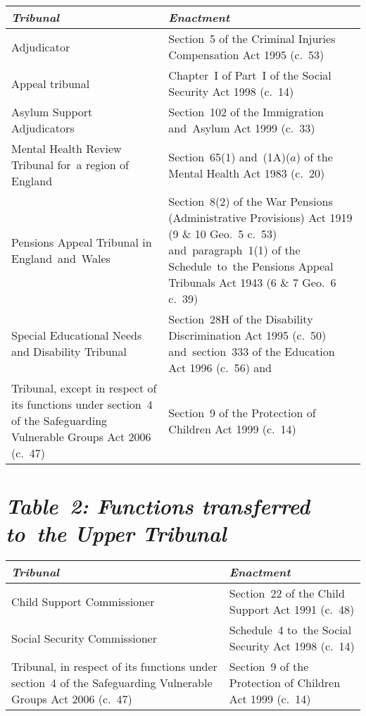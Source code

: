 \documentclass[12pt,a4paper]{article}
\begin{document}
{\noindent
\begin{longtable}{p{153.47604pt}p{212.50781pt}}
\hline
\itshape Tribunal	& \itshape Enactment\\
\hline
\endhead
\hline
\endlastfoot
Adjudicator	&Section~5 of the Criminal Injuries Compensation Act 1995 (c.~53)\\
Appeal tribunal	&Chapter~I of Part~I of the Social Security Act 1998 (c.~14)\\
Asylum Support Adjudicators	&Section~102 of the Immigration and~Asylum Act 1999 (c.~33)\\
Mental Health Review Tribunal for~a region of England	&Section~65(1) and~(1A)($a$)  of the Mental Health Act 1983 (c.~20)\\
Pensions Appeal Tribunal in England~and~Wales	&Section~8(2) of the War Pensions (Administrative Provisions) Act 1919 (9 \& 10 Geo.~5 c.~53) and~paragraph~1(1) of the Schedule~to~the Pensions Appeal Tribunals Act 1943 (6 \& 7 Geo.~6 c.~39)\\
Special Educational Needs and Disability Tribunal	&Section~28H of the Disability Discrimination Act 1995 (c.~50) and~section~333 of the Education Act 1996 (c.~56) and\\
Tribunal, except in respect of its functions under section~4 of the Safeguarding Vulnerable Groups Act 2006 (c.~47)	&Section~9 of the Protection of Children Act 1999 (c.~14)\\
\end{longtable}

}

\section*{\itshape Table~2: Functions transferred to~the Upper Tribunal}

{\noindent
\begin{longtable}{p{241.53224pt}p{124.46164pt}}
\hline
\itshape Tribunal	& \itshape Enactment\\
\hline
\endhead
\hline
\endlastfoot
Child Support Commissioner	&Section~22 of the Child Support Act 1991 (c.~48)\\
Social Security Commissioner	&Schedule~4 to~the Social Security Act 1998 (c.~14)\\
Tribunal, in respect of its functions under section~4 of the Safeguarding Vulnerable Groups Act 2006 (c.~47)	&Section~9 of the Protection of Children Act 1999 (c.~14)\\
\end{longtable}

}
\end{document}
